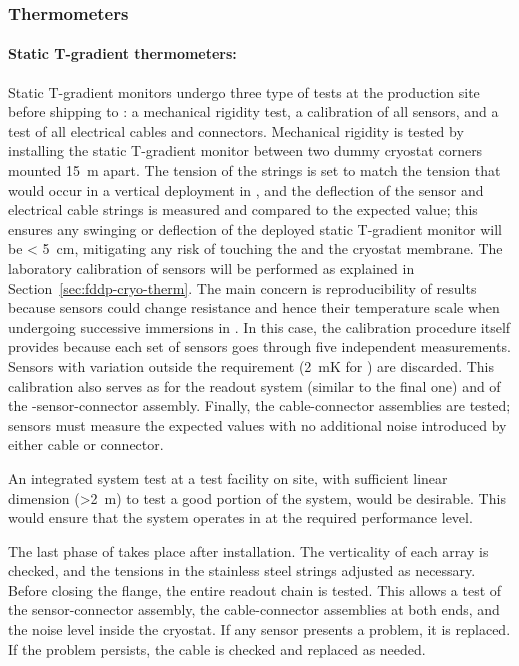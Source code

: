 \subsubsection{Thermometers}
\label{sec:fdgen-slow-cryo-qc-th}

\paragraph{Static T-gradient thermometers:}
\label{sec:fdgen-slow-cryo-qc-thst}

Static T-gradient monitors undergo three type of tests at the production site before %
shipping to \surf: a mechanical rigidity test, a calibration of all sensors, and a test of all electrical cables and connectors.
Mechanical rigidity is tested by installing the static T-gradient monitor between two dummy cryostat corners mounted \SI{15}{m} apart. The tension of the strings is set to match the tension that would occur in a vertical deployment in \lar, and the deflection of the sensor and electrical cable strings is measured and compared to the expected value; this ensures any swinging or deflection of the deployed static T-gradient monitor will be < \SI{5}{cm}, mitigating any risk of touching the  and the cryostat membrane.
The laboratory calibration of sensors will be performed 
as explained in Section~\ref{sec:fddp-cryo-therm}. The main concern is reproducibility of results because sensors could change resistance and hence their temperature scale when undergoing successive immersions in \lar. In this case, the calibration procedure itself provides  because each set of sensors goes through five independent measurements. Sensors with \rms variation outside the requirement (\SI{2}{mK} for ) are discarded. This calibration also serves as  for the readout system (similar to the final one) and of the -sensor-connector assembly.
Finally, the cable-connector assemblies are tested; sensors must measure the expected values with no additional noise introduced by either cable or connector. 

An integrated system test at a  test facility on site, with sufficient linear dimension (>\SI{2}{m}) to test a good portion of the system, would be desirable. This would ensure that the system
operates in \lar at the required performance level. 

The last phase of  takes place after installation. The verticality of each array %
is checked, and the tensions in the stainless steel strings adjusted as necessary.
Before closing the flange, the entire readout chain is %
tested.  
This allows a test of the sensor-connector assembly, the cable-connector assemblies at both ends, and the noise level inside the cryostat.
If any sensor presents a problem, it is replaced. If the problem persists, the cable is checked and replaced as needed.

